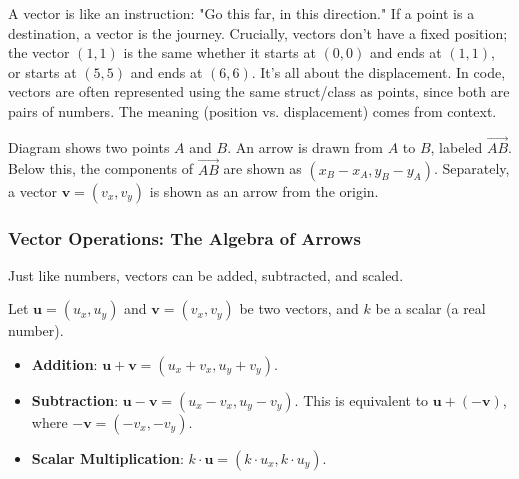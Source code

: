 \begin{intuition}
\label{intuition:A.1.1.vector}
A vector is like an instruction: "Go this far, in this direction." If a point is a destination, a vector is the journey. Crucially, vectors don't have a fixed position; the vector $(1,1)$ is the same whether it starts at $(0,0)$ and ends at $(1,1)$, or starts at $(5,5)$ and ends at $(6,6)$. It's all about the displacement.
In code, vectors are often represented using the same struct/class as points, since both are pairs of numbers. The meaning (position vs. displacement) comes from context.
\end{intuition}

\begin{visualexample}
\label{vis:A.1.1.vector}
Diagram shows two points $A$ and $B$. An arrow is drawn from $A$ to $B$, labeled $\vec{AB}$. Below this, the components of $\vec{AB}$ are shown as $(x_B-x_A, y_B-y_A)$. Separately, a vector $\mathbf{v}=(v_x, v_y)$ is shown as an arrow from the origin.
\end{visualexample}

\subsubsection{Vector Operations: The Algebra of Arrows}
\label{sssec:A.1.1.2}

Just like numbers, vectors can be added, subtracted, and scaled.

\begin{definition}
\label{def:A.1.1.vector_ops}
Let $\mathbf{u} = (u_x, u_y)$ and $\mathbf{v} = (v_x, v_y)$ be two vectors, and $k$ be a scalar (a real number).
\begin{itemize}
    \item \textbf{Addition}: $\mathbf{u} + \mathbf{v} = (u_x + v_x, u_y + v_y)$.
    \item \textbf{Subtraction}: $\mathbf{u} - \mathbf{v} = (u_x - v_x, u_y - v_y)$. This is equivalent to $\mathbf{u} + (-\mathbf{v})$, where $-\mathbf{v} = (-v_x, -v_y)$.
    \item \textbf{Scalar Multiplication}: $k \cdot \mathbf{u} = (k \cdot u_x, k \cdot u_y)$.
\end{itemize}
\end{definition}

